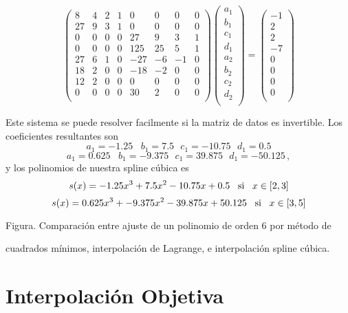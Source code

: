 \documentclass[
]{agujournal2019}
\begin{document}
\[\left(\begin{array}{cccccccc}
  8 & 4 & 2 & 1 & 0 & 0 & 0 & 0\\
  27 & 9 & 3 & 1 & 0 & 0 & 0 & 0\\
  0 & 0 & 0 & 0 & 27 & 9 & 3 & 1\\
  0 & 0 & 0 & 0 & 125 & 25 & 5 & 1\\
  27 & 6 & 1 & 0 & -27 & -6 & -1 & 0\\
  18 & 2 & 0 & 0 & -18 & -2 & 0 & 0\\
  12 & 2 & 0 & 0 & 0 & 0 & 0 & 0\\
  0 & 0 & 0 & 0 & 30 & 2 & 0 & 0\\
    \end{array}\right)\left(\begin{array}{c}
  a_1 \\
  b_1 \\
  c_1 \\
  d_1 \\
  a_2 \\
  b_2 \\
  c_2 \\
  d_2 \\
    \end{array}\right)=
    \left(\begin{array}{c}
  -1 \\
  2 \\
  2 \\
  -7 \\
  0 \\
  0 \\
  0 \\
  0 \\
    \end{array}\right)\]

Este sistema se puede resolver facilmente si la matriz de datos es
invertible. Los coeficientes resultantes son
\[a_1=-1.25\,\,\,\,\,b_1=7.5\,\,\,\,c_1=-10.75\,\,\,\,d_1=0.5\]
\[a_1=0.625\,\,\,\,\,b_1=-9.375\,\,\,\,c_1=39.875\,\,\,\,d_1=-50.125\,,\]
y los polinomios de nuestra spline cúbica es
\[s(x)=-1.25x^3+7.5x^2-10.75x+0.5\,\,\,\,\,{\rm si}\,\,\,\,\,x\in[2,3]\]
\[s(x)=0.625x^3+-9.375x^2-39.875x+50.125\,\,\,\,\,{\rm si}\,\,\,\,\,x\in[3,5]\]

\centerline{Figura. Comparación entre ajuste de un polinomio de orden 6
por método de}
\centerline{cuadrados mínimos, interpolación de Lagrange, e interpolación
spline cúbica.}

\hypertarget{interpolaciuxf3n-objetiva}{%
\section{Interpolación Objetiva}\label{interpolaciuxf3n-objetiva}}
\end{document}
